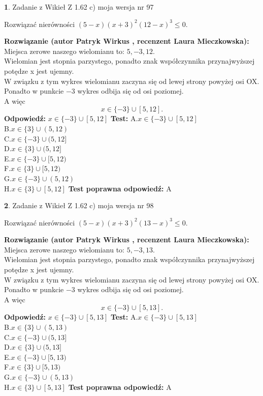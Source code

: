\documentclass[12pt, a4paper]{article}
\theoremstyle{definition} %
\newtheorem{zad}{}
\newcommand{\zadStart}[1]{\begin{zad}#1\newline}
\newcommand{\zadStop}{\end{zad}}
\newcommand{\rozwStart}[2]{\noindent \textbf{Rozwiązanie (autor #1 , recenzent #2): }\newline}
\newcommand{\rozwStop}{\newline}
\newcommand{\odpStart}{\noindent \textbf{Odpowiedź:}\newline}
\newcommand{\odpStop}{\newline}
\newcommand{\testStart}{\noindent \textbf{Test:}\newline}
\newcommand{\testStop}{\newline}
\newcommand{\kluczStart}{\noindent \textbf{Test poprawna odpowiedź:}\newline}
\newcommand{\kluczStop}{\newline}
\begin{document}
\zadStart{Zadanie z Wikieł Z 1.62 c) moja wersja nr 97}

Rozwiązać nierówności $(5-x)(x+3)^{2}(12-x)^{3}\le0$.
\zadStop
\rozwStart{Patryk Wirkus}{Laura Mieczkowska}
Miejsca zerowe naszego wielomianu to: $5, -3, 12$.\\
Wielomian jest stopnia parzystego, ponadto znak współczynnika przy\linebreak najwyższej potędze x jest ujemny.\\ W związku z tym wykres wielomianu zaczyna się od lewej strony powyżej osi OX.\\
Ponadto w punkcie $-3$ wykres odbija się od osi poziomej.\\
A więc $$x \in \{-3\} \cup [5,12].$$
\rozwStop
\odpStart
$x \in \{-3\} \cup [5,12]$
\odpStop
\testStart
A.$x \in \{-3\} \cup [5,12]$\\
B.$x \in \{3\} \cup (5,12)$\\
C.$x \in \{-3\} \cup (5,12]$\\
D.$x \in \{3\} \cup (5,12]$\\
E.$x \in \{-3\} \cup [5,12)$\\
F.$x \in \{3\} \cup [5,12)$\\
G.$x \in \{-3\} \cup (5,12)$\\
H.$x \in \{3\} \cup [5,12]$
\testStop
\kluczStart
A
\kluczStop



\zadStart{Zadanie z Wikieł Z 1.62 c) moja wersja nr 98}

Rozwiązać nierówności $(5-x)(x+3)^{2}(13-x)^{3}\le0$.
\zadStop
\rozwStart{Patryk Wirkus}{Laura Mieczkowska}
Miejsca zerowe naszego wielomianu to: $5, -3, 13$.\\
Wielomian jest stopnia parzystego, ponadto znak współczynnika przy\linebreak najwyższej potędze x jest ujemny.\\ W związku z tym wykres wielomianu zaczyna się od lewej strony powyżej osi OX.\\
Ponadto w punkcie $-3$ wykres odbija się od osi poziomej.\\
A więc $$x \in \{-3\} \cup [5,13].$$
\rozwStop
\odpStart
$x \in \{-3\} \cup [5,13]$
\odpStop
\testStart
A.$x \in \{-3\} \cup [5,13]$\\
B.$x \in \{3\} \cup (5,13)$\\
C.$x \in \{-3\} \cup (5,13]$\\
D.$x \in \{3\} \cup (5,13]$\\
E.$x \in \{-3\} \cup [5,13)$\\
F.$x \in \{3\} \cup [5,13)$\\
G.$x \in \{-3\} \cup (5,13)$\\
H.$x \in \{3\} \cup [5,13]$
\testStop
\kluczStart
A
\kluczStop
\end{document}
